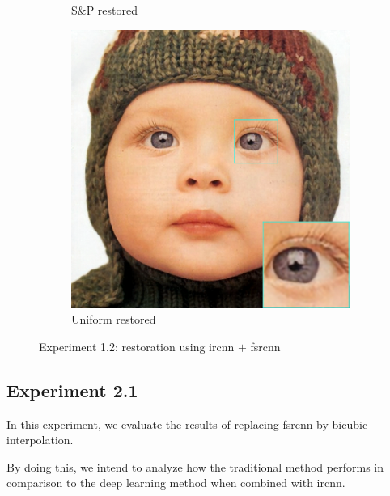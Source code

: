 \begin{figure}
\begin{subfigure}{0.24\textwidth}
		\caption{S\&P restored}
	\end{subfigure}
	\begin{subfigure}{0.24\textwidth}
		\includegraphics[width=\textwidth]{images/exp1.2/uniform.png}
		\caption{Uniform restored}
	\end{subfigure}
	\caption{Experiment 1.2: restoration using \gls{ircnn} $+$ \gls{fsrcnn}}
	\label{fig:exp1.2}
\end{figure}


\subsection{Experiment 2.1}

In this experiment, we evaluate the results of replacing \gls{fsrcnn} by bicubic interpolation.

By doing this, we intend to analyze how the traditional method performs in comparison to the deep learning method when combined with \gls{ircnn}. 

